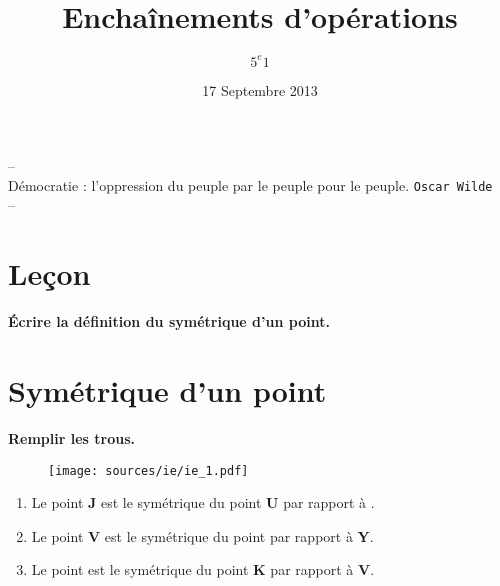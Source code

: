 \documentclass[11pt]{article}
\title{Enchaînements d'opérations} %
\author{$5^e 1$}
\date{17 Septembre 2013} %
\begin{document}

\begin{center}
  \vspace*{-2cm}
  \textsf{--}\\
  \textsf{Démocratie : l’oppression du peuple par le peuple pour le peuple.}
  \texttt{Oscar Wilde}\\
  \textsf{--}
\end{center}

\thispagestyle{empty}

\section{Leçon}
\textbf{Écrire la définition du symétrique d'un point.}


\section{Symétrique d'un point}
\textbf{Remplir les trous.}

\begin{figure}[H]
  \centering
  \texttt{[image: sources/ie/ie\_1.pdf]}
\end{figure}

\begin{enumerate}
\item Le point \textbf{J} est le symétrique du point \textbf{U} par rapport à \underline{\phantom{123456}}.
\item Le point \textbf{V} est le symétrique du point \underline{\phantom{123456}} par rapport à  \textbf{Y}.
\item Le point \underline{\phantom{123456}} est le symétrique du point \textbf{K} par rapport à  \textbf{V}.
\end{enumerate}


\end{document}
